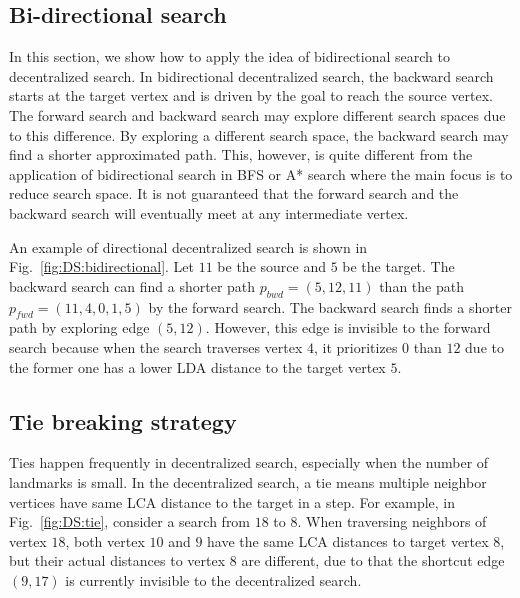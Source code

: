\subsection{Bi-directional search}

In this section, we show how to apply the idea of bidirectional search to decentralized search. In bidirectional decentralized search, the backward search starts at the target vertex and is driven by the goal to reach the source vertex. The forward search and backward search may explore different search spaces due to this difference. By exploring a different search space, the backward search may find a shorter approximated path. This, however, is quite different from the application of bidirectional search in BFS or A* search where the main focus is to reduce search space. It is not guaranteed that the forward search and the backward search will eventually meet at any intermediate vertex. 

An example of directional decentralized search is shown in Fig.~\ref{fig:DS:bidirectional}. Let $11$ be the source and $5$ be the target. The backward search can find a shorter path $p_{bwd} = (5, 12, 11)$ than the path $p_{fwd} = (11, 4, 0, 1, 5)$ by the forward search. The backward search finds a shorter path by exploring edge $(5, 12)$. However, this edge is invisible to the forward search because when the search traverses vertex $4$, it prioritizes $0$ than $12$ due to the former one has a lower LDA distance to the target vertex $5$.


\subsection{Tie breaking strategy}

Ties happen frequently in decentralized search, especially when the number of landmarks is small. In the decentralized search, a tie means multiple neighbor vertices have same LCA distance to the target in a step. 
For example, in Fig.~\ref{fig:DS:tie}, consider a search from $18$ to $8$. When traversing neighbors of vertex $18$, both vertex $10$ and $9$ have the same LCA distances to target vertex $8$, but their actual distances to vertex $8$ are different, due to that the shortcut edge $(9, 17)$ is currently invisible to the decentralized search.

